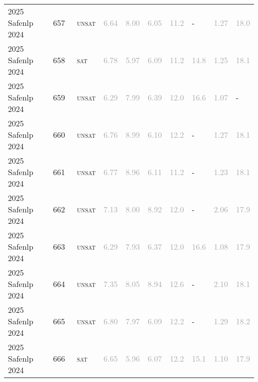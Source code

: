 \begin{center}
{\begin{longtable}{@{}llllllllll@{}}
2025 Safenlp 2024 & 657 & ~\textsc{unsat} & \textcolor{darkgray}{6.64} & \textcolor{darkgray}{8.00} & \textcolor{darkgray}{6.05} & \textcolor{darkgray}{11.2} & - & \textcolor{darkgray}{1.27} & \textcolor{darkgray}{18.0} \\
2025 Safenlp 2024 & 658 & ~\textsc{sat} & \textcolor{darkgray}{6.78} & \textcolor{darkgray}{5.97} & \textcolor{darkgray}{6.09} & \textcolor{darkgray}{11.2} & \textcolor{darkgray}{14.8} & \textcolor{darkgray}{1.25} & \textcolor{darkgray}{18.1} \\
2025 Safenlp 2024 & 659 & ~\textsc{unsat} & \textcolor{darkgray}{6.29} & \textcolor{darkgray}{7.99} & \textcolor{darkgray}{6.39} & \textcolor{darkgray}{12.0} & \textcolor{darkgray}{16.6} & \textcolor{darkgray}{1.07} & - \\
2025 Safenlp 2024 & 660 & ~\textsc{unsat} & \textcolor{darkgray}{6.76} & \textcolor{darkgray}{8.99} & \textcolor{darkgray}{6.10} & \textcolor{darkgray}{12.2} & - & \textcolor{darkgray}{1.27} & \textcolor{darkgray}{18.1} \\
2025 Safenlp 2024 & 661 & ~\textsc{unsat} & \textcolor{darkgray}{6.77} & \textcolor{darkgray}{8.96} & \textcolor{darkgray}{6.11} & \textcolor{darkgray}{11.2} & - & \textcolor{darkgray}{1.23} & \textcolor{darkgray}{18.1} \\
2025 Safenlp 2024 & 662 & ~\textsc{unsat} & \textcolor{darkgray}{7.13} & \textcolor{darkgray}{8.00} & \textcolor{darkgray}{8.92} & \textcolor{darkgray}{12.0} & - & \textcolor{darkgray}{2.06} & \textcolor{darkgray}{17.9} \\
2025 Safenlp 2024 & 663 & ~\textsc{unsat} & \textcolor{darkgray}{6.29} & \textcolor{darkgray}{7.93} & \textcolor{darkgray}{6.37} & \textcolor{darkgray}{12.0} & \textcolor{darkgray}{16.6} & \textcolor{darkgray}{1.08} & \textcolor{darkgray}{17.9} \\
2025 Safenlp 2024 & 664 & ~\textsc{unsat} & \textcolor{darkgray}{7.35} & \textcolor{darkgray}{8.05} & \textcolor{darkgray}{8.94} & \textcolor{darkgray}{12.6} & - & \textcolor{darkgray}{2.10} & \textcolor{darkgray}{18.1} \\
2025 Safenlp 2024 & 665 & ~\textsc{unsat} & \textcolor{darkgray}{6.80} & \textcolor{darkgray}{7.97} & \textcolor{darkgray}{6.09} & \textcolor{darkgray}{12.2} & - & \textcolor{darkgray}{1.29} & \textcolor{darkgray}{18.2} \\
2025 Safenlp 2024 & 666 & ~\textsc{sat} & \textcolor{darkgray}{6.65} & \textcolor{darkgray}{5.96} & \textcolor{darkgray}{6.07} & \textcolor{darkgray}{12.2} & \textcolor{darkgray}{15.1} & \textcolor{darkgray}{1.10} & \textcolor{darkgray}{17.9} \\

\end{longtable}}
\end{center}
